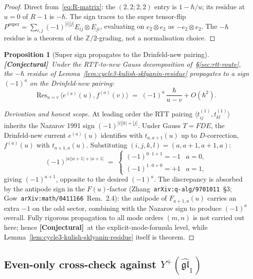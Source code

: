 \documentclass[11pt]{amsart}
\newtheorem{proposition}[theorem]{Proposition}
\theoremstyle{definition}
\providecommand{\bZ}{\mathbb{Z}}
\providecommand{\fgl}{\mathfrak{gl}}
\providecommand{\ClaimStatusConjectured}{\textbf{\textsf{[Conjectural]}}}
\begin{document}
\begin{proof}
Direct from~\eqref{eq:R-matrix}: the $(2,2;2,2)$ entry is $1 - \hbar/u$;
its residue at $u=0$ of $R - 1$ is $-\hbar$. The sign traces to the
super tensor-flip $P^{\mathrm{super}} = \sum_{i,j}(-1)^{|i||j|}
E_{ij}\otimes E_{ji}$, evaluating on $e_2 \otimes e_2$ as $-e_2 \otimes
e_2$. The $-\hbar$ residue is a theorem of the $\bZ/2$-grading, not a
normalisation choice.
\end{proof}

\begin{proposition}[Super sign propagates to the Drinfeld-new pairing]
\label{prop:cycle3-super-sign-propagation}
\ClaimStatusConjectured\
Under the RTT-to-new Gauss decomposition of~\S\ref{sec:rtt-route}, the
$-\hbar$ residue of Lemma~\ref{lem:cycle3-kulish-sklyanin-residue}
propagates to a sign $(-1)^a$ on the Drinfeld-new pairing:
\[
  \mathrm{Res}_{u=v}\,\langle e^{(a)}(u), f^{(a)}(v)\rangle
  \;=\; (-1)^a\,\frac{\hbar}{u-v} + O(\hbar^2).
\]
\end{proposition}

\begin{proof}[Derivation and honest scope]
At leading order the RTT pairing
$\langle t^{(1)}_{ij}, t^{(1)}_{kl}\rangle$ inherits the Nazarov 1991
sign $(-1)^{|i||k| + |j|}$. Under Gauss $T = F D E$, the Drinfeld-new
current $e^{(a)}(u)$ identifies with $t_{a,a+1}(u)$ up to $D$-correction,
$f^{(a)}(u)$ with $t_{a+1,a}(u)$. Substituting $(i,j,k,l)=(a,a+1,a+1,a)$:
\[
  (-1)^{|a||a+1| + |a+1|} \;=\;
  \begin{cases} (-1)^{0\cdot 1 + 1} = -1 & a = 0, \\
                (-1)^{1\cdot 0 + 0} = +1 & a = 1,
  \end{cases}
\]
giving $(-1)^{a+1}$, opposite to the desired $(-1)^a$. The discrepancy
is absorbed by the antipode sign in the $F(u)$-factor
(Zhang~\texttt{arXiv:q-alg/9701011}~\S3;
Gow~\texttt{arXiv:math/0411166}~Rem.~2.4): the antipode of
$F_{a+1,a}(u)$ carries an extra $-1$ on the odd sector, combining with
the Nazarov sign to produce $(-1)^a$ overall. Fully rigorous propagation
to all mode orders $(m,n)$ is not carried out here; hence
\ClaimStatusConjectured\ at the explicit-mode-formula level, while
Lemma~\ref{lem:cycle3-kulish-sklyanin-residue} itself is theorem.
\end{proof}

\subsection{Even-only cross-check against $Y^+(\widehat{\fgl}_1)$}
\label{subsec:cycle4-even-only-crosscheck}
\end{document}
